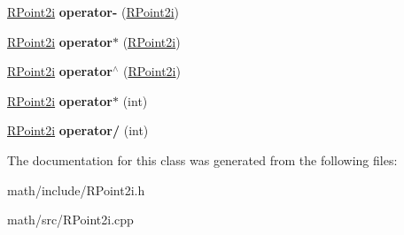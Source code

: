 \begin{DoxyCompactItemize}
\item 
\hypertarget{classRPoint2i_ad5b55b678d2a186b6a796493cadef4f2}{
\hyperlink{classRPoint2i}{RPoint2i} {\bfseries operator-\/} (\hyperlink{classRPoint2i}{RPoint2i})}
\label{classRPoint2i_ad5b55b678d2a186b6a796493cadef4f2}

\item 
\hypertarget{classRPoint2i_ad91208629c87ccab23588c055472c869}{
\hyperlink{classRPoint2i}{RPoint2i} {\bfseries operator$\ast$} (\hyperlink{classRPoint2i}{RPoint2i})}
\label{classRPoint2i_ad91208629c87ccab23588c055472c869}

\item 
\hypertarget{classRPoint2i_ae5c04de1a59c76da04245330e8729c6a}{
\hyperlink{classRPoint2i}{RPoint2i} {\bfseries operator$^\wedge$} (\hyperlink{classRPoint2i}{RPoint2i})}
\label{classRPoint2i_ae5c04de1a59c76da04245330e8729c6a}

\item 
\hypertarget{classRPoint2i_a8195aab0a1b1d0faf82a80f5feceefad}{
\hyperlink{classRPoint2i}{RPoint2i} {\bfseries operator$\ast$} (int)}
\label{classRPoint2i_a8195aab0a1b1d0faf82a80f5feceefad}

\item 
\hypertarget{classRPoint2i_ab9d18c17616afe42cb28e53ebc1bf334}{
\hyperlink{classRPoint2i}{RPoint2i} {\bfseries operator/} (int)}
\label{classRPoint2i_ab9d18c17616afe42cb28e53ebc1bf334}

\end{DoxyCompactItemize}


The documentation for this class was generated from the following files:\begin{DoxyCompactItemize}
\item 
math/include/RPoint2i.h\item 
math/src/RPoint2i.cpp\end{DoxyCompactItemize}
